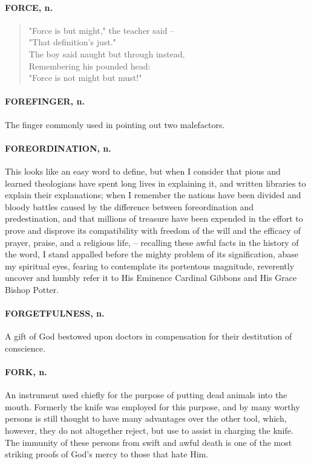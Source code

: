 \documentclass[11pt]{article}
\begin{document}
\paragraph{FORCE, n.}

\begin{quote}   "Force is but might," the teacher said -- \\
      "That definition's just." \\
  The boy said naught but through instead, \\
  Remembering his pounded head: \\
      "Force is not might but must!"  \end{quote}

\paragraph{FOREFINGER, n.}  The finger commonly used in pointing out two
malefactors.

\paragraph{FOREORDINATION, n.}  This looks like an easy word to define, but when I
consider that pious and learned theologians have spent long lives in
explaining it, and written libraries to explain their explanations;
when I remember the nations have been divided and bloody battles
caused by the difference between foreordination and predestination,
and that millions of treasure have been expended in the effort to
prove and disprove its compatibility with freedom of the will and the
efficacy of prayer, praise, and a religious life, -- recalling these
awful facts in the history of the word, I stand appalled before the
mighty problem of its signification, abase my spiritual eyes, fearing
to contemplate its portentous magnitude, reverently uncover and humbly
refer it to His Eminence Cardinal Gibbons and His Grace Bishop Potter.

\paragraph{FORGETFULNESS, n.}  A gift of God bestowed upon doctors in compensation
for their destitution of conscience.

\paragraph{FORK, n.}  An instrument used chiefly for the purpose of putting dead
animals into the mouth.  Formerly the knife was employed for this
purpose, and by many worthy persons is still thought to have many
advantages over the other tool, which, however, they do not altogether
reject, but use to assist in charging the knife.  The immunity of
these persons from swift and awful death is one of the most striking
proofs of God's mercy to those that hate Him.
\end{document}
